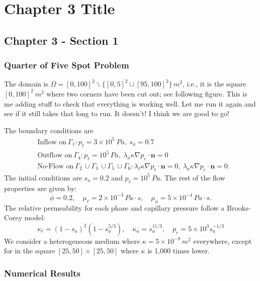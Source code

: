 \chapter[Chapter 3-Convergence Results]{Chapter 3 Title}
\label{sec:chapter3}
\setcounter{secnumdepth}{3}
%
%
\minitoc
%

	\section{Chapter 3 - Section 1}
\label{sec:chapter_3_sec_1}


\subsection{Quarter of Five Spot Problem}
The domain is $\Omega = [0,100]^2 \backslash  \{[0,5]^2 \cup [95,100]^2\} \, m^2$, i.e., it is the square $[0,100]^2 \ m^2$ where two corners have been cut out; see following figure. This is me adding stuff to check that everything is working well. Let me run it again and see if it still takes that long to run. It doesn't! I think we are good to go!

The boundary conditions are
\begin{align}
	&\text{Inflow on} \ \Gamma_1 : p_\ell = 3 \times 10^5 \ Pa, \ s_a = 0.7 \nonumber  \\
	&\text{Outflow on} \ \Gamma_4 : p_\ell = 10^5 \, Pa, \ \lambda_a \kappa \nabla p_c \cdot \textbf{n} = 0   \nonumber \\
	& \text{No-Flow on} \ \Gamma_2 \, \cup \Gamma_3 \, \cup \Gamma_5 \, \cup \Gamma_6 :  \lambda_\ell \kappa \nabla p_\ell \cdot \textbf{n} = 0, \ \lambda_a \kappa \nabla p_c \cdot \textbf{n} = 0. \nonumber
\end{align}
The initial conditions are $s_a = 0.2$ and $p_\ell = 10^5 \ Pa$. The rest of the flow properties are given by:
\[
	\phi = 0.2, \quad \mu_\ell = 2 \times 10^{-3} \, Pa \cdot s, \quad \mu_a = 5 \times 10^{-4} \, Pa \cdot s.
\]
The relative permeability for each phase and capillary pressure follow a Brooks-Corey model:
\[ 
\kappa_\ell = (1-s_a)^2(1-s_a^{5/3}), \quad \kappa_a = s_a^{11/3}, \quad p_c = 5 \times 10^3 s_a^{-1/3}
\]
We consider a heterogeneous medium where $\kappa = 5 \times 10^{-8} \, m^2$ everywhere, except for in the square $[25, 50] \times [25,50]$ where $\kappa$ is 1,000 times lower.





\subsection{Numerical Results}


